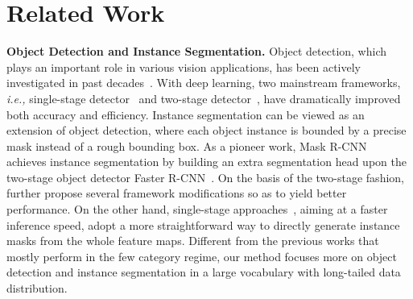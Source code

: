 \documentclass[sigconf]{acmart}
\newcommand{\myparagraph}[1]{{\vspace{0.5em} \noindent \bf #1}}
\begin{document}
\section{Related Work}
\vspace{-2mm}
\myparagraph{Object Detection and Instance Segmentation.} Object detection, which plays an important role in various vision applications, has been actively investigated in past decades~\cite{faster_rcnn,focal_loss,SML,TFAN,snip,cao_tcsvt19,cao_cvpr20,cao_cvpr19}. With deep learning, two mainstream frameworks, \emph{i.e.,} single-stage detector~\cite{ssd,focal_loss,cao_iccv19} and two-stage detector~\cite{rcnn,fast_rcnn,faster_rcnn}, have dramatically improved both accuracy and efficiency. Instance segmentation can be viewed as an extension of object detection, where each object instance is bounded by a precise mask instead of a rough bounding box. As a pioneer work, Mask R-CNN~\cite{maskrcnn} achieves instance segmentation by building an extra segmentation head upon the two-stage object detector Faster R-CNN~\cite{faster_rcnn}. On the basis of the two-stage fashion,~\cite{fcis,mask_score,panet} further propose several framework modifications so as to yield better performance. On the other hand, single-stage approaches~\cite{yolact,xu_iccv19,dai_eccv16,cao_eccv20}, aiming at a faster inference speed, adopt a more straightforward way to directly generate instance masks from the whole feature maps. Different from the previous works that mostly perform in the few category regime, our method focuses more on object detection and instance segmentation in a large vocabulary with long-tailed data distribution.
\end{document}
